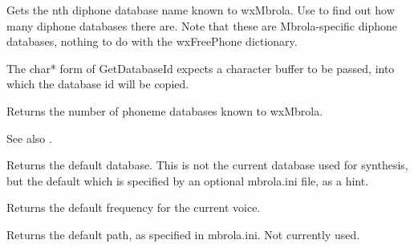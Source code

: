 \label{wxmbrolagetdatabaseid}




Gets the nth diphone database name known to wxMbrola. Use  to
find out how many diphone databases there are. Note that these are Mbrola-specific diphone databases, nothing to do with
the wxFreePhone dictionary.

The char* form of GetDatabaseId expects a character buffer to be passed,
into which the database id will be copied.

\label{wxmbrolagetdatabasecount}


Returns the number of phoneme databases known to wxMbrola.

See also .

\label{wxmbrolagetdefaultdatabase}




Returns the default database. This is not the current database used for synthesis, but the default which
is specified by an optional mbrola.ini file, as a hint.

\label{wxmbrolagetdefaultfreq}


Returns the default frequency for the current voice.

\label{wxmbrolagetdefaultpath}




Returns the default path, as specified in mbrola.ini. Not currently used.

